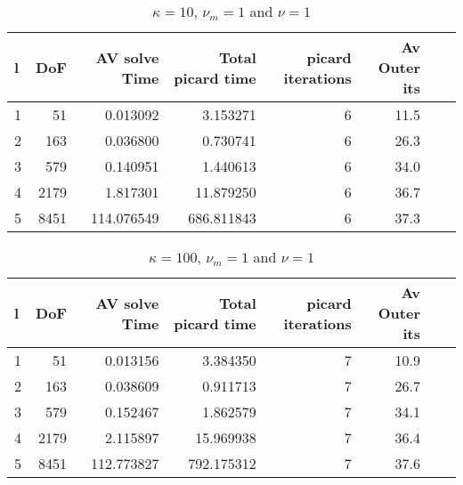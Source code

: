 \documentclass{article}
\begin{document}
\begin{table}[h!]
\begin{tabular}{lrrrrrll}
\hline
 l &   DoF &  AV solve Time &  Total picard time &  picard iterations & Av Outer its \\
\hline
 1 &    51 &       0.013092 &           3.153271 &                  6 &         11.5 \\
 2 &   163 &       0.036800 &           0.730741 &                  6 &         26.3 \\
 3 &   579 &       0.140951 &           1.440613 &                  6 &         34.0 \\
 4 &  2179 &       1.817301 &          11.879250 &                  6 &         36.7 \\
 5 &  8451 &     114.076549 &         686.811843 &                  6 &         37.3 \\
\hline
\end{tabular}
\caption{$\kappa = 10$, $\nu_m = 1$ and $\nu=1$}
\end{table}

\begin{table}[h!]
\begin{tabular}{lrrrrrll}
\hline
 l &   DoF &  AV solve Time &  Total picard time &  picard iterations & Av Outer its \\
\hline
 1 &    51 &       0.013156 &           3.384350 &                  7 &         10.9\\
 2 &   163 &       0.038609 &           0.911713 &                  7 &         26.7\\
 3 &   579 &       0.152467 &           1.862579 &                  7 &         34.1\\
 4 &  2179 &       2.115897 &          15.969938 &                  7 &         36.4\\
 5 &  8451 &     112.773827 &         792.175312 &                  7 &         37.6\\
\hline
\end{tabular}
\caption{$\kappa = 100$, $\nu_m = 1$ and $\nu=1$}
\end{table}
\end{document}
